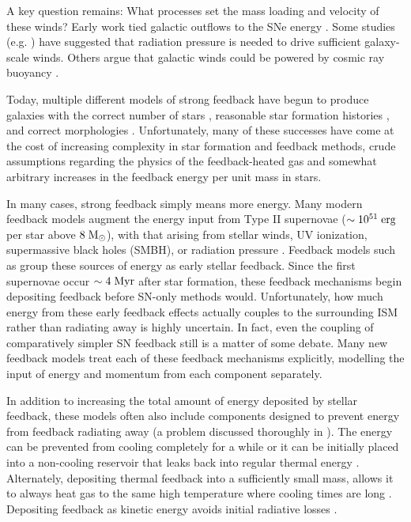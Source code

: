 A key question remains: What processes set the mass loading and velocity of
these winds?  Early work tied galactic outflows to the SNe energy
\citep{Springel2003}.  Some studies (e.g. \citealt{Murray2005,Krumholz2013})
have suggested that radiation pressure is needed to drive sufficient
galaxy-scale winds.  Others argue that galactic winds could be powered by cosmic
ray buoyancy \citep{Ipavich1975,Breitschwerdt1991,Socrates2008}.

Today, multiple different models of strong feedback have begun to produce
galaxies with the correct number of stars \citep{Aumer2013}, reasonable star
formation histories \citep{Stinson2013,Agertz2015,Munshi2013}, and correct
morphologies \citep{Guedes2011,Brook2012,Christensen2014}.   Unfortunately, many
of these successes have come at the cost of increasing complexity in star
formation and feedback methods, crude assumptions regarding the physics of the
feedback-heated gas and somewhat arbitrary increases in the feedback energy per
unit mass in stars.  

In many cases, strong feedback simply means more energy.  Many modern feedback
models augment the energy input from Type II supernovae ($\sim10^{51}\;
\rm{erg}$ per star above $8\; \rm{M_\odot}$), with that arising from stellar
winds, UV ionization, supermassive black holes (SMBH), or radiation pressure
\citep{Vogelsberger2013, Agertz2015}.  Feedback models such as
\citet{Stinson2013} group these sources of energy as early stellar feedback.
Since the first supernovae occur $\sim4\; \rm{Myr}$ after star formation, these
feedback mechanisms begin depositing feedback before SN-only methods would.
Unfortunately, how much energy from these early feedback effects actually
couples to the surrounding ISM rather than radiating away is highly uncertain.
In fact, even the coupling of comparatively simpler SN feedback still is a
matter of some debate.  Many new feedback models \citep{Agertz2013, Aumer2013,
Hopkins2013} treat each of these feedback mechanisms explicitly, modelling the
input of energy and momentum from each component separately.  

In addition to increasing the total amount of energy deposited by stellar
feedback, these models often also include components designed to prevent energy
from feedback radiating away (a problem discussed thoroughly in
\citealt{Thacker2000}).   The energy can be prevented from cooling completely
for a while \citep{Stinson2013} or it can be initially placed into a non-cooling
reservoir that leaks back into regular thermal energy \citep{Agertz2013}.
Alternately, depositing thermal feedback into a sufficiently small mass, allows
it to always heat gas to the same high temperature where cooling times are long
\citep{DallaVecchia2012}.  Depositing feedback as kinetic energy avoids initial
radiative losses \citet{Springel2003,Agertz2013,Hopkins2013}.  

